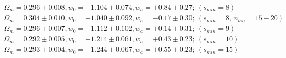 \documentclass[useAMS,usenatbib]{mnras}
\begin{document}
\begin{eqnarray}
\Omega_m = 0.296 \pm 0.008, w_0 = -1.104 \pm 0.074, w_a = +0.84 \pm 0.27;\ (s_{min}=8)\\
\Omega_m = 0.304 \pm 0.010, w_0 = -1.040 \pm 0.092, w_a = -0.17 \pm 0.30;\ (s_{min}=8,\ n_{bin}=15-20)\\
\Omega_m = 0.296 \pm 0.007, w_0 = -1.112 \pm 0.102, w_a = +0.14 \pm 0.31;\ (s_{min}=9)\\
\Omega_m = 0.292 \pm 0.005, w_0 = -1.214 \pm 0.061, w_a = +0.43 \pm 0.23;\ (s_{min}=10)\\
\Omega_m = 0.293 \pm 0.004, w_0 = -1.244 \pm 0.067, w_a = +0.55 \pm 0.23;\ (s_{min}=15)\\

\end{eqnarray}
\end{document}
